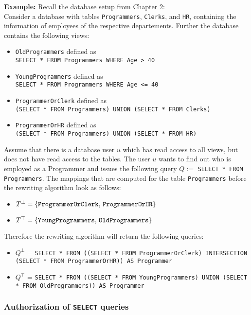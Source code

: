 \smallskip
\noindent
{\bf Example:}
Recall the database setup from Chapter 2:
\\
Consider a database with tables \texttt{Programmers}, \texttt{Clerks}, and \texttt{HR}, containing the information of employees of the respective departements.
%
Further the database contains the following views:
\begin{itemize}
	\item \texttt{OldProgrammers} defined as \\ \texttt{SELECT * FROM Programmers WHERE Age > 40}
	\item \texttt{YoungProgrammers} defined as \\ \texttt{SELECT * FROM Programmers WHERE Age <= 40}
	\item \texttt{ProgrammerOrClerk} defined as \\ \texttt{(SELECT * FROM Programmers) UNION (SELECT * FROM Clerks)}
	\item \texttt{ProgrammerOrHR} defined as \\ \texttt{(SELECT * FROM Programmers) UNION (SELECT * FROM HR)}
\end{itemize}
%
Assume that there is a database user $u$ which has read access to all views, but does not have read access to the tables.
%
The user $u$ wants to find out who is employed as a Programmer and issues the following query $Q := $ \texttt{SELECT * FROM Programmers}.
%
The mappings that are computed for the table \texttt{Programmers} before the rewriting algorithm look as follows:
\begin{itemize}
	\item $T^\bot = \lbrace \text{\texttt{ProgrammerOrClerk}, \texttt{ProgrammerOrHR}} \rbrace$
	\item $T^\top = \lbrace \text{\texttt{YoungProgrammers}, \texttt{OldProgrammers}} \rbrace$
\end{itemize}
%
Therefore the rewriting algorithm will return the following queries:
\begin{itemize}
	\item $Q^\bot$ = \texttt{SELECT * FROM ((SELECT * FROM ProgrammerOrClerk) INTERSECTION (SELECT * FROM ProgrammerOrHR)) AS Programmer}
	\item $Q^\top$ = \texttt{SELECT * FROM ((SELECT * FROM YoungProgrammers) UNION (SELECT * FROM OldProgrammers)) AS Programmer}
\end{itemize}

\subsubsection{Authorization of \texttt{SELECT} queries}

